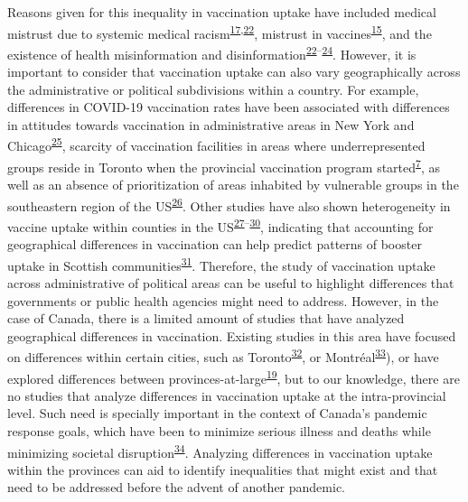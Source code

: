\documentclass[
]{article}
\begin{document}
Reasons given for this inequality in vaccination uptake have included
medical mistrust due to systemic medical
racism\textsuperscript{\protect\hyperlink{ref-stoler2021}{17},\protect\hyperlink{ref-mosby2021}{22}},
mistrust in
vaccines\textsuperscript{\protect\hyperlink{ref-willis2021}{15}}, and
the existence of health misinformation and
disinformation\textsuperscript{\protect\hyperlink{ref-mosby2021}{22}--\protect\hyperlink{ref-freeman2020}{24}}.
However, it is important to consider that vaccination uptake can also
vary geographically across the administrative or political subdivisions
within a country. For example, differences in COVID-19 vaccination rates
have been associated with differences in attitudes towards vaccination
in administrative areas in New York and
Chicago\textsuperscript{\protect\hyperlink{ref-malik2020}{25}}, scarcity
of vaccination facilities in areas where underrepresented groups reside
in Toronto when the provincial vaccination program
started\textsuperscript{\protect\hyperlink{ref-bogoch2022}{7}}, as well
as an absence of prioritization of areas inhabited by vulnerable groups
in the southeastern region of the
US\textsuperscript{\protect\hyperlink{ref-nguyen2021}{26}}. Other
studies have also shown heterogeneity in vaccine uptake within counties
in the
US\textsuperscript{\protect\hyperlink{ref-mollalo2021}{27}--\protect\hyperlink{ref-bhuiyan2022}{30}},
indicating that accounting for geographical differences in vaccination
can help predict patterns of booster uptake in Scottish
communities\textsuperscript{\protect\hyperlink{ref-wood2022}{31}}.
Therefore, the study of vaccination uptake across administrative of
political areas can be useful to highlight differences that governments
or public health agencies might need to address. However, in the case of
Canada, there is a limited amount of studies that have analyzed
geographical differences in vaccination. Existing studies in this area
have focused on differences within certain cities, such as
Toronto\textsuperscript{\protect\hyperlink{ref-choi2021}{32}}, or
Montréal\textsuperscript{\protect\hyperlink{ref-mckinnon2021}{33}}), or
have explored differences between
provinces-at-large\textsuperscript{\protect\hyperlink{ref-guay2022}{19}},
but to our knowledge, there are no studies that analyze differences in
vaccination uptake at the intra-provincial level. Such need is specially
important in the context of Canada's pandemic response goals, which have
been to minimize serious illness and deaths while minimizing societal
disruption\textsuperscript{\protect\hyperlink{ref-naci2023}{34}}.
Analyzing differences in vaccination uptake within the provinces can aid
to identify inequalities that might exist and that need to be addressed
before the advent of another pandemic.
\end{document}
